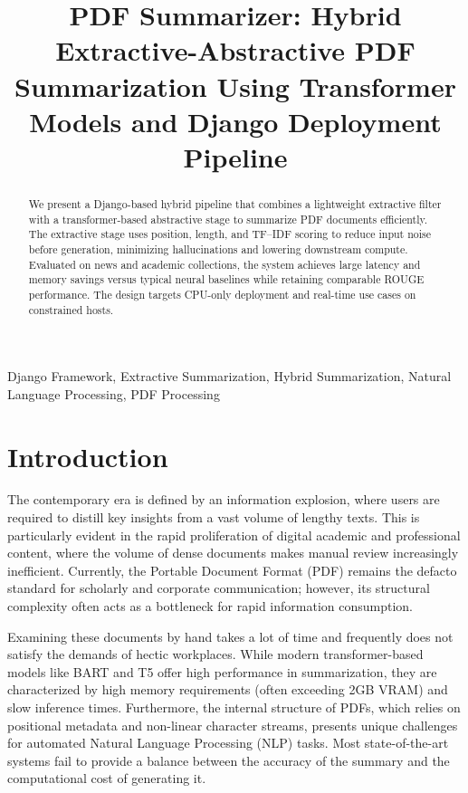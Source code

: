 \documentclass[conference]{IEEEtran}
\begin{document}
\title{PDF Summarizer: Hybrid Extractive-Abstractive PDF Summarization Using Transformer Models and Django Deployment Pipeline}
\date{}%

\author{
}

\maketitle

\begin{abstract}
We present a Django-based hybrid pipeline that combines a lightweight extractive filter with a transformer-based abstractive stage to summarize PDF documents efficiently. The extractive stage uses position, length, and TF--IDF scoring to reduce input noise before generation, minimizing hallucinations and lowering downstream compute. Evaluated on news and academic collections, the system achieves large latency and memory savings versus typical neural baselines while retaining comparable ROUGE performance. The design targets CPU-only deployment and real-time use cases on constrained hosts.
\end{abstract}

\begin{IEEEkeywords}
Django Framework, Extractive Summarization, Hybrid Summarization, Natural Language Processing, PDF Processing
\end{IEEEkeywords}

\section{Introduction}

The contemporary era is defined by an information explosion, where users are required to distill key insights from a vast volume of lengthy texts. This is particularly evident in the rapid proliferation of digital academic and professional content, where the volume of dense documents makes manual review increasingly inefficient. Currently, the Portable Document Format (PDF) remains the defacto standard for scholarly and corporate communication; however, its structural complexity often acts as a bottleneck for rapid information consumption.

Examining these documents by hand takes a lot of time and frequently does not satisfy the demands of hectic workplaces. While modern transformer-based models like BART and T5 offer high performance in summarization, they are characterized by high memory requirements (often exceeding 2GB VRAM) and slow inference times. Furthermore, the internal structure of PDFs, which relies on positional metadata and non-linear character streams, presents unique challenges for automated Natural Language Processing (NLP) tasks. Most state-of-the-art systems fail to provide a balance between the accuracy of the summary and the computational cost of generating it.
\end{document}
